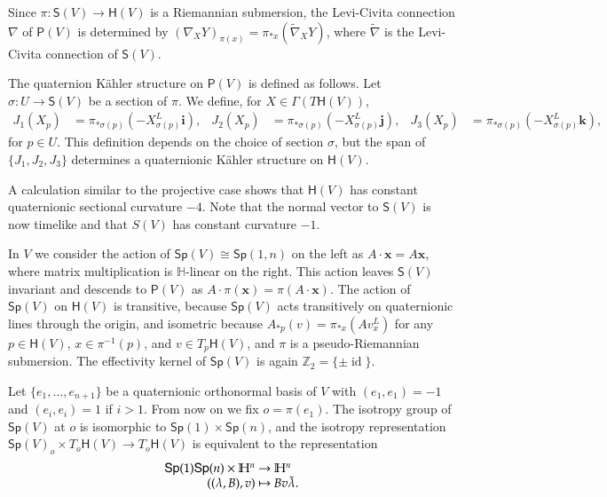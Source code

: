 \documentclass[12pt, a4paper]{amsart}
\newcommand{\id}{\operatorname{id}}
\renewcommand{\H}{\mathbb{H}}
\newcommand{\Sp}{\mathsf{Sp}}
\theoremstyle{remark}
\begin{document}
Since $\pi\colon\mathsf{S}(V)\to\mathsf{H}(V)$ is a Riemannian submersion, the Levi-Civita connection $\nabla$ of $\mathsf{P}(V)$ is determined by
$(\nabla_X Y)_{\pi(x)}=\pi_{*x}(\tilde{\nabla}_X Y)$,
where $\tilde{\nabla}$ is the Levi-Civita connection of $\mathsf{S}(V)$.

The quaternion K\"ahler structure on $\mathsf{P}(V)$ is defined as follows.
Let $\sigma\colon U\to\mathsf{S}(V)$ be a section of $\pi$.
We define, for $X\in\Gamma(T\mathsf{H}(V))$,
\[
\begin{aligned}
J_1(X_p)&{}=\pi_{*\sigma(p)}(-X_{\sigma(p)}^L\mathbf{i}),
&J_2(X_p)&{}=\pi_{*\sigma(p)}(-X_{\sigma(p)}^L\mathbf{j}),
&J_3(X_p)&{}=\pi_{*\sigma(p)}(-X_{\sigma(p)}^L\mathbf{k}),
\end{aligned}
\]
for $p\in U$.
This definition depends on the choice of section $\sigma$, but the span of $\{J_1,J_2,J_3\}$ determines a quaternionic K\"ahler structure on $\mathsf{H}(V)$.

A calculation similar to the projective case shows that $\mathsf{H}(V)$ has constant quaternionic sectional curvature $-4$. 
Note that the normal vector to $\mathsf{S}(V)$ is now timelike and that $S(V)$ has constant curvature $-1$.
\medskip

In $V$ we consider the action of $\Sp(V)\cong\Sp(1,n)$ on the left as
$A\cdot\mathbf{x}=A\mathbf{x}$, where matrix multiplication is $\H$-linear on the right.
This action leaves $\mathsf{S}(V)$ invariant and descends to $\mathsf{P}(V)$ as $A\cdot\pi(\mathbf{x})=\pi(A\cdot\mathbf{x})$.
The action of $\Sp(V)$ on $\mathsf{H}(V)$ is transitive, because $\Sp(V)$ acts transitively on quaternionic lines through the origin, and isometric because
$A_{*p}(v)=\pi_{*x}(Av_x^L)$ for any $p\in\mathsf{H}(V)$, $x\in\pi^{-1}(p)$, and $v\in T_p\mathsf{H}(V)$, and $\pi$ is a pseudo-Riemannian submersion.
The effectivity kernel of $\Sp(V)$ is again $\mathbb{Z}_2=\{\pm \id\}$.

Let $\{e_1,\dots,e_{n+1}\}$ be a quaternionic orthonormal basis of $V$ with $(e_1,e_1)=-1$ and $(e_i,e_i)=1$ if $i>1$.
From now on we fix $o=\pi(e_1)$.
The isotropy group of $\Sp(V)$ at $o$ is isomorphic to $\Sp(1)\times\Sp(n)$, 
and the isotropy representation $\Sp(V)_o\times T_o\mathsf{H}(V)\to T_o\mathsf{H}(V)$
is equivalent to the representation
\[
\begin{array}{r@{\ }c@{\ }l}
\Sp(1)\Sp(n)\times\H^n & \to & \H^n\\
((\lambda,B),v) & \mapsto & Bv\bar{\lambda}.
\end{array}
\]
\end{document}
